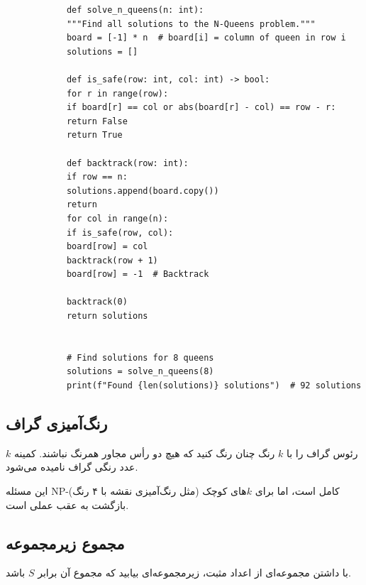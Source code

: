 \documentclass{matinbook}
\begin{document}
    \begin{latin}
        \begin{verbatim}
            def solve_n_queens(n: int):
            """Find all solutions to the N-Queens problem."""
            board = [-1] * n  # board[i] = column of queen in row i
            solutions = []
            
            def is_safe(row: int, col: int) -> bool:
            for r in range(row):
            if board[r] == col or abs(board[r] - col) == row - r:
            return False
            return True
            
            def backtrack(row: int):
            if row == n:
            solutions.append(board.copy())
            return
            for col in range(n):
            if is_safe(row, col):
            board[row] = col
            backtrack(row + 1)
            board[row] = -1  # Backtrack
            
            backtrack(0)
            return solutions
            
            
            # Find solutions for 8 queens
            solutions = solve_n_queens(8)
            print(f"Found {len(solutions)} solutions")  # 92 solutions
        \end{verbatim}
    \end{latin}
    \label{code:n-queens}
    
    \subsection{رنگ‌آمیزی گراف}
    
    \begin{definition}
        رئوس گراف را با $k$ رنگ چنان رنگ کنید
        که هیچ دو رأس مجاور همرنگ نباشند.
        کمینه $k$ عدد رنگی گراف نامیده می‌شود.
        \label{def:graph-coloring}
    \end{definition}
    
    این مسئله NP-کامل است، اما برای $k$های کوچک
    (مثل رنگ‌آمیزی نقشه با ۴ رنگ)
    بازگشت به عقب عملی است.
    
    \subsection{مجموع زیرمجموعه}
    
    \begin{definition}
        با داشتن مجموعه‌ای از اعداد مثبت،
        زیرمجموعه‌ای بیابید که مجموع آن
        برابر $S$ باشد.
        \label{def:subset-sum}
    \end{definition}
    
\end{document}
